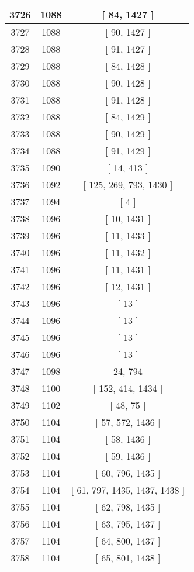 \begin{center}
\begin{longtable}[H]{|| c c c ||}
\hline
3726 & 1088 & [ 84, 1427 ] \\ 
\hline
3727 & 1088 & [ 90, 1427 ] \\ 
\hline
3728 & 1088 & [ 91, 1427 ] \\ 
\hline
3729 & 1088 & [ 84, 1428 ] \\ 
\hline
3730 & 1088 & [ 90, 1428 ] \\ 
\hline
3731 & 1088 & [ 91, 1428 ] \\ 
\hline
3732 & 1088 & [ 84, 1429 ] \\ 
\hline
3733 & 1088 & [ 90, 1429 ] \\ 
\hline
3734 & 1088 & [ 91, 1429 ] \\ 
\hline
3735 & 1090 & [ 14, 413 ] \\ 
\hline
3736 & 1092 & [ 125, 269, 793, 1430 ] \\ 
\hline
3737 & 1094 & [ 4 ] \\ 
\hline
3738 & 1096 & [ 10, 1431 ] \\ 
\hline
3739 & 1096 & [ 11, 1433 ] \\ 
\hline
3740 & 1096 & [ 11, 1432 ] \\ 
\hline
3741 & 1096 & [ 11, 1431 ] \\ 
\hline
3742 & 1096 & [ 12, 1431 ] \\ 
\hline
3743 & 1096 & [ 13 ] \\ 
\hline
3744 & 1096 & [ 13 ] \\ 
\hline
3745 & 1096 & [ 13 ] \\ 
\hline
3746 & 1096 & [ 13 ] \\ 
\hline
3747 & 1098 & [ 24, 794 ] \\ 
\hline
3748 & 1100 & [ 152, 414, 1434 ] \\ 
\hline
3749 & 1102 & [ 48, 75 ] \\ 
\hline
3750 & 1104 & [ 57, 572, 1436 ] \\ 
\hline
3751 & 1104 & [ 58, 1436 ] \\ 
\hline
3752 & 1104 & [ 59, 1436 ] \\ 
\hline
3753 & 1104 & [ 60, 796, 1435 ] \\ 
\hline
3754 & 1104 & [ 61, 797, 1435, 1437, 1438 ] \\ 
\hline
3755 & 1104 & [ 62, 798, 1435 ] \\ 
\hline
3756 & 1104 & [ 63, 795, 1437 ] \\ 
\hline
3757 & 1104 & [ 64, 800, 1437 ] \\ 
\hline
3758 & 1104 & [ 65, 801, 1438 ] \\ 

\end{longtable}
\end{center}
